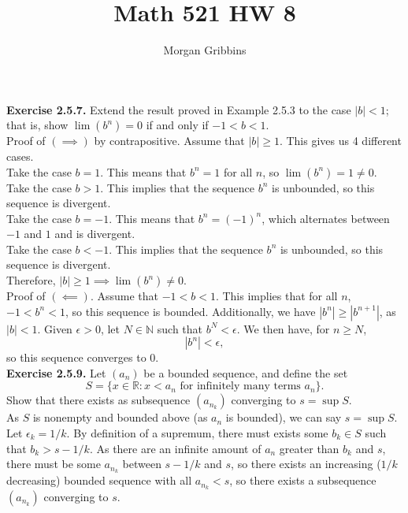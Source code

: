 \documentclass[12pt,letterpaper]{article}
\title{Math 521 HW 8}
\author{Morgan Gribbins}
\date{}
\begin{document}
	
\maketitle

\textbf{Exercise 2.5.7.} Extend the result proved in Example 2.5.3 to the case \(|b| < 1\); that is, show \(\lim(b^{n})=0\) if and only if \(-1 < b < 1\). \\

Proof of \((\implies)\) by contrapositive. Assume that \(|b| \geq 1\). This gives us 4 different cases. \\

Take the case \(b=1\). This means that \(b^{n} = 1\) for all \(n\), so \(\lim(b^{n}) = 1 \neq 0.\) \\

Take the case \(b>1\). This implies that the sequence \(b^{n}\) is unbounded, so this sequence is divergent. \\

Take the case \(b=-1\). This means that \(b^{n} = (-1)^{n}\), which alternates between \(-1\) and \(1\) and is divergent. \\

Take the case \(b<-1\). This implies that the sequence \(b^{n}\) is unbounded, so this sequence is divergent. \\

Therefore, \(|b|\geq 1 \implies \lim(b^{n}) \neq 0\). \\

Proof of \((\impliedby)\). Assume that \(-1 < b < 1\). This implies that for all \(n\), \(-1 < b^{n} < 1\), so this sequence is bounded. Additionally, we have \(|b^{n}| \geq |b^{n+1}|\), as \(|b| < 1\). Given \(\epsilon > 0\), let \(N \in \mathbb{N}\) such that \(b^{N} < \epsilon\). We then have, for \(n \geq N\), \[|b^{n}| < \epsilon,\] so this sequence converges to 0. \\

\textbf{Exercise 2.5.9.} Let \((a_{n})\) be a bounded sequence, and define the set \[S = \{x \in \mathbb{R} : x < a_{n} \text{ for infinitely many terms } a_{n}\}.\] Show that there exists as subsequence \((a_{n_{k}})\) converging to \(s = \sup S\).\\

As \(S\) is nonempty and bounded above (as \(a_{n}\) is bounded), we can say \(s = \sup S\). Let \(\epsilon_{k} = 1/k\). By definition of a supremum, there must exists some \(b_{k} \in S\) such that \(b_{k} > s - 1/k\). As there are an infinite amount of \(a_{n}\) greater than \(b_{k}\) and \(s\), there must be some \(a_{n_{k}}\) between \(s - 1/k\) and \(s\), so there exists an increasing (\(1/k\) decreasing) bounded sequence with all \(a_{n_{k}} < s\), so there exists a subsequence \((a_{n_{k}})\) converging to \(s\). \\
\end{document}
